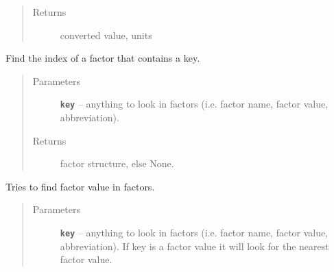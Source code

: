 \documentclass[letterpaper,10pt,english]{sphinxmanual}
\begin{document}
\begin{fulllineitems}
\begin{fulllineitems}
\begin{quote}
\begin{description}
\item[{Returns}] \leavevmode
converted value, units

\end{description}\end{quote}

\end{fulllineitems}


\begin{fulllineitems}
\label{RRtoolbox.lib:RRtoolbox.lib.root.FactorConvert.exactFactorIndex}
Find the index of a factor that contains a key.
\begin{quote}\begin{description}
\item[{Parameters}] \leavevmode
\textbf{\texttt{key}} -- anything to look in factors (i.e. factor name, factor value, abbreviation).

\item[{Returns}] \leavevmode
factor structure, else None.

\end{description}\end{quote}

\end{fulllineitems}


\begin{fulllineitems}
\label{RRtoolbox.lib:RRtoolbox.lib.root.FactorConvert.factor}
\end{fulllineitems}


\begin{fulllineitems}
\label{RRtoolbox.lib:RRtoolbox.lib.root.FactorConvert.factors}
\end{fulllineitems}


\begin{fulllineitems}
\label{RRtoolbox.lib:RRtoolbox.lib.root.FactorConvert.getFactor}
Tries to find factor value in factors.
\begin{quote}\begin{description}
\item[{Parameters}] \leavevmode
\textbf{\texttt{key}} -- anything to look in factors (i.e. factor name, factor value, abbreviation).
If key is a factor value it will look for the nearest factor value.


\end{description}
\end{quote}
\end{fulllineitems}
\end{fulllineitems}
\end{document}
